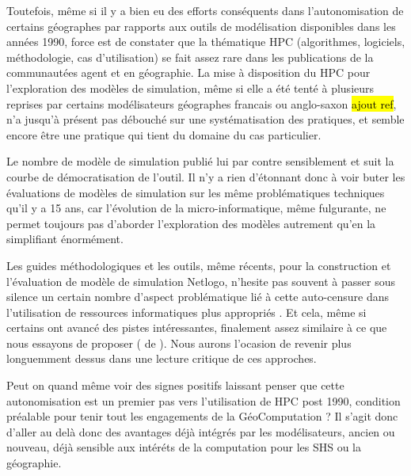 Toutefois, même si il y a bien eu des efforts conséquents dans l'autonomisation de certains géographes par rapports aux outils de modélisation disponibles dans les années 1990, force est de constater que la thématique HPC (algorithmes, logiciels, méthodologie, cas d'utilisation) se fait assez rare dans les publications de la communautées agent et en géographie. La mise à disposition du HPC pour l'exploration des modèles de simulation, même si elle a été tenté à plusieurs reprises par certains modélisateurs géographes francais ou anglo-saxon \autocite{Heppenstall2007} \hl{ajout ref}, n'a jusqu'à présent pas débouché sur une systématisation des pratiques, et semble encore être une pratique qui tient du domaine du cas particulier.

Le nombre de modèle de simulation publié lui par contre sensiblement et suit la courbe de démocratisation de l'outil. Il n'y a rien d'étonnant donc à voir buter les évaluations de modèles de simulation sur les même problématiques techniques qu'il y a 15 ans, car l'évolution de la micro-informatique, même fulgurante, ne permet toujours pas d'aborder l'exploration des modèles autrement qu'en la simplifiant énormément.

Les guides méthodologiques et les outils, même récents, pour la construction et l'évaluation de modèle de simulation Netlogo, n'hesite pas souvent à passer sous silence un certain nombre d'aspect problématique lié à cette auto-censure dans l'utilisation de ressources informatiques plus appropriés \autocites{Gilbert2008, Grimm2011a}. Et cela, même si certains ont avancé des pistes intéressantes, finalement assez similaire à ce que nous essayons de proposer (\textcite{Behavior Search} de \textcite{Stonedahl2011a}). Nous aurons l'ocasion de revenir plus longuemment dessus dans une lecture critique de ces approches.

Peut on quand même voir des signes positifs laissant penser que cette autonomisation est un premier pas vers l'utilisation de HPC post 1990, condition préalable pour tenir tout les engagements de la GéoComputation ? Il s'agit donc d'aller au delà donc des avantages déjà intégrés par les modélisateurs, ancien ou nouveau, déjà sensible aux intéréts de la computation pour les SHS ou la géographie.

